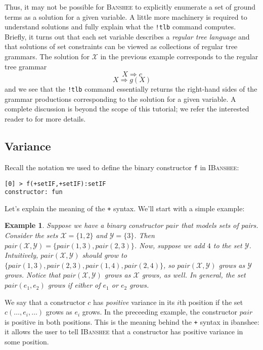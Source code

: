 \documentclass[10pt]{article}
\newcommand{\banshee}{\textsc{Banshee}}
\newcommand{\ibanshee}{\textsc{IBanshee}}
\newcommand{\var}[1]{\mathcal{#1}}
\newtheorem{example}{Example}
\begin{document}
Thus, it may not be possible for \banshee{} to explicitly enumerate a
set of ground terms as a solution for a given variable. A little more
machinery is required to understand solutions and fully explain what
the \texttt{!tlb} command computes.  Briefly, it turns out that each
set variable describes a \emph{regular tree language} and that
solutions of set constraints can be viewed as collections of regular
tree grammars. The solution for $\var{X}$ in the previous example
corresponds to the regular tree grammar
\[
X \Rightarrow c
\]
\[
X \Rightarrow g(X)
\]
and we see that the \texttt{!tlb} command essentially returns the
right-hand sides of the grammar productions corresponding to the
solution for a given variable. A complete discussion is beyond the
scope of this tutorial; we refer the interested reader to
\cite{heintze:thesis} for more details.

\subsection{Variance}

Recall the notation we used to define the binary constructor
\texttt{f} in \ibanshee{}:

\begin{verbatim}
[0] > f(+setIF,+setIF):setIF
constructor: fun
\end{verbatim}

Let's explain the meaning of the \texttt{+} syntax. We'll start with a
simple example:

\begin{example}
Suppose we have a binary constructor $pair$ that models sets of
pairs. Consider the sets $\var{X} = \{1,2\}$ and $\var{Y} =
\{3\}$. Then $pair(\var{X}, \var{Y}) = \{pair(1,3),pair(2,3)\}$. Now,
suppose we add $4$ to the set $\var{Y}$. Intuitively, $pair(\var{X},
\var{Y})$ should grow to
$\{pair(1,3),pair(2,3),pair(1,4),pair(2,4)\}$, so
$pair(\var{X},\var{Y})$ grows as $\var{Y}$ grows. Notice that
$pair(\var{X},\var{Y})$ grows as $\var{X}$ grows, as well. In general,
the set $pair(e_1,e_2)$ grows if either of $e_1$ or $e_2$ grows.
\end{example}

We say that a constructor $c$ has \emph{positive} variance in its
$i$th position if the set $c(\ldots,e_i,\ldots)$ grows as $e_i$
grows. In the preceeding example, the constructor $pair$ is positive
in both positions. This is the meaning behind the \texttt{+} syntax in
ibanshee{}: it allows the user to tell \ibanshee{} that a constructor
has positive variance in some position.
\end{document}
